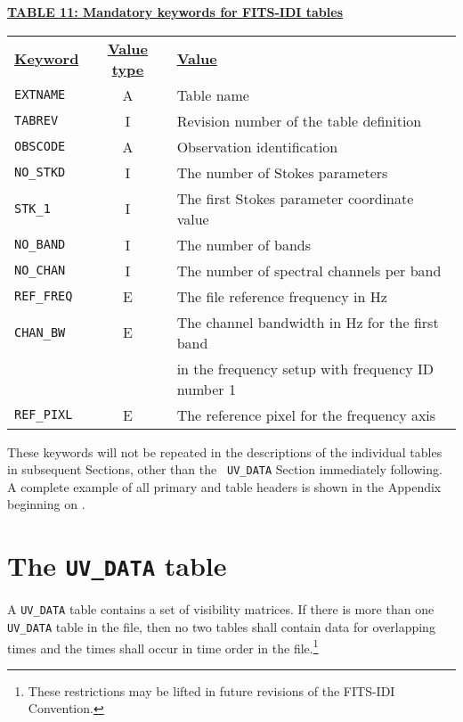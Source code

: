 \documentclass[twoside]{article}
\newcommand{\Hi}[1]{\textcolor{hicol}{#1}}
\begin{document}
\begin{center}
\underline{\bf{TABLE \Hi{11}: Mandatory keywords for FITS-IDI tables}}\\
\begin{tabular}{lcl}
\noalign{\vspace{2pt}}
\underline{{\bf Keyword}} & \underline{\bf{Value type}} &
    \underline{\bf{Value\vphantom{y}}} \\
\noalign{\vspace{2pt}} \label{ta:keywords}
{\tt EXTNAME}   & A & Table name \\
{\tt TABREV}    & I & Revision number of the table definition \\
\Hi{{\tt OBSCODE}} & \Hi{A} & \Hi{Observation identification} \\
{\tt NO\_STKD}  & I & The number of Stokes parameters \\
{\tt STK\_1}    & I & The first Stokes parameter \Hi{coordinate value} \\
{\tt NO\_BAND}  & I & The number of bands \\
{\tt NO\_CHAN}  & I & The number of spectral channels \Hi{per band} \\
{\tt REF\_FREQ} & E & The file reference frequency in Hz \\
{\tt CHAN\_BW}  & E & The channel bandwidth in Hz for the first band \\
                &   & in the frequency \Hi{setup} with frequency ID number 1 \\
{\tt REF\_PIXL} & E & The reference pixel for the frequency axis
\end{tabular}
\end{center}

These keywords will not be repeated in the descriptions of the
individual tables in subsequent \Hi{Sections, other than the {\tt
UV\_DATA} Section immediately following.}  \Hi{A complete example of
  all primary and table headers is shown in the Appendix beginning on
  \pageref{appendix}.}

\section{The {\tt UV\_DATA} table}
\label{s:UV}

A {\tt UV\_DATA} table contains a set of visibility matrices.  If
there is more than one {\tt UV\_DATA} table in the file, then no two
tables shall contain data for overlapping times and the times shall
occur in time order in the file.\footnote{These restrictions may be
lifted in future revisions of the FITS-IDI \Hi{Convention}.}
\end{document}
